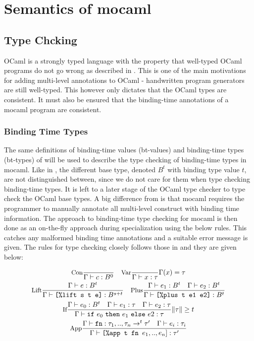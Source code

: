
\section{Semantics of mocaml}

\subsection{Type Chcking}

OCaml is a strongly typed language with the property that well-typed OCaml programs do not go wrong as described in \cite{MilnerRobin1978Atot}. This is one of the main motivations for adding multi-level annotations to OCaml - handwritten program generators are still well-typed. This however only dictates that the OCaml types are consistent. It must also be ensured that the binding-time annotations of a mocaml program are consistent. %

\subsubsection{Binding Time Types}

The same definitions of binding-time values (bt-values) and binding-time types (bt-types) of \cite{multilevel} will be used to describe the type checking of binding-time types in mocaml. Like in \cite{multilevel}, the different base type, denoted $B^t$ with binding type value $t$, are not distinguished between, since we do not care for them when type checking binding-time types. It is left to a later stage of the OCaml type checker to type check the OCaml base types.
A big difference from \cite{multilevel} is that mocaml requires the programmer to manually annotate all multi-level construct with binding time information. The approach to binding-time type checking for mocaml is then done as an on-the-fly approach during specialization using the below rules. This catches any malformed binding time annotations and a suitable error message is given. The rules for type checking closely follows those in \cite{multilevel} and they are given below:

\begin{gather*}
  \text{\small Con} \dfrac{}{\Gamma \vdash c : B^0} \quad
  \text{\small Var} \dfrac{}{\Gamma \vdash x : \tau}\Gamma(x)=\tau\\
  \text{\small Lift} \dfrac{
    \Gamma \vdash e : B^t
  }{
    \Gamma \vdash \text{\texttt{[\%lift s t e]}} : B^{s+t}
  }
  \quad
  \text{\small Plus} \dfrac{
    \Gamma \vdash e_1 : B^t \quad
    \Gamma \vdash e_2 : B^t
  }{
    \Gamma \vdash \text{\texttt{[\%plus t e1 e2]}} : B^t
  }
  \\  
  \text{\small If} \dfrac{
    \Gamma \vdash e_0 : B^t \quad
    \Gamma \vdash e_1 : \tau \quad
    \Gamma \vdash e_2 : \tau
  }{\Gamma \vdash \mathtt{if}~e_0~\mathtt{then}~e_1~\mathtt{else}~e2 : \tau
  }\|\tau\| \ge t
  \\
  \text{\small App} \dfrac{
    \Gamma \vdash \mathtt{fn} : \tau_1,..,\tau_n \rightarrow ^t \tau' \quad
    \Gamma \vdash e_i : \tau_i
  }{
    \Gamma \vdash \text{\texttt{[\%app t fn }}e_1,..,e_n] : \tau'
  }
\end{gather*}

